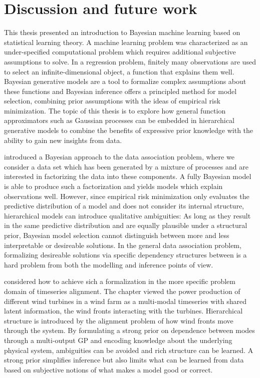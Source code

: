 \chapter{Discussion and future work}
\label{toc:discussion}
This thesis presented an introduction to Bayesian machine learning based on statistical learning theory.
A machine learning problem was characterized as an under-specified computational problem which requires additional subjective assumptions to solve.
In a regression problem, finitely many observations are used to select an infinite-dimensional object, a function that explains them well.
Bayesian generative models are a tool to formalize complex assumptions about these functions and Bayesian inference offers a principled method for model selection, combining prior assumptions with the ideas of empirical risk minimization.
The topic of this thesis is to explore how general function approximators such as Gaussian processes can be embedded in hierarchical generative models to combine the benefits of expressive prior knowledge with the ability to gain new insights from data.

 introduced a Bayesian approach to the data association problem, where we consider a data set which has been generated by a mixture of processes and are interested in factorizing the data into these components.
A fully Bayesian model is able to produce such a factorization and yields models which explain observations well.
However, since empirical risk minimization only evaluates the predictive distribution of a model and does not consider its internal structure, hierarchical models can introduce qualitative ambiguities:
As long as they result in the same predictive distribution and are equally plausible under a structural prior, Bayesian model selection cannot distinguish between more and less interpretable or desireable solutions.
In the general data association problem, formalizing desireable solutions via specific dependency structures between is a hard problem from both the modelling and inference points of view.

 considered how to achieve sich a formalization in the more specific problem domain of timeseries alignment.
The chapter viewed the power production of different wind turbines in a wind farm as a multi-modal timeseries with shared latent information, the wind fronts interacting with the turbines.
Hierarchical structure is introduced by the alignment problem of how wind fronts move through the system.
By formulating a strong prior on dependence between modes through a multi-output GP and encoding knowledge about the underlying physical system, ambiguities can be avoided and rich structure can be learned.
A strong prior simplifies inference but also limits what can be learned from data based on subjective notions of what makes a model good or correct.

